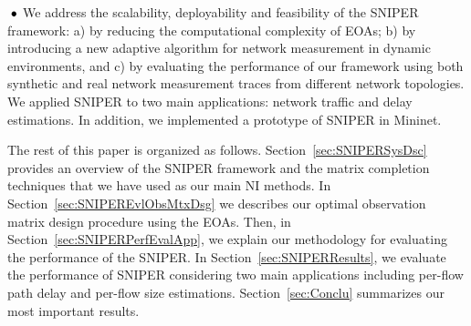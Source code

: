 \textbf{$\text{\hspace{0.1cm}}\bullet$} We address the scalability, deployability and feasibility of the SNIPER framework: a) by reducing the computational complexity of EOAs; b) by introducing a new adaptive algorithm for network measurement in dynamic environments, and c) by evaluating the performance of our framework using both synthetic and real network measurement traces from different network topologies. We applied SNIPER to two main applications: network traffic and delay estimations. In addition, we implemented a prototype of SNIPER in Mininet.

The rest of this paper is organized as follows. Section~\ref{sec:SNIPERSysDsc} provides an overview of the SNIPER framework and
the matrix completion techniques that we have used as our main NI methods.  In Section~\ref{sec:SNIPEREvlObsMtxDsg} we describes our
optimal observation matrix design procedure using the EOAs. Then, in Section~\ref{sec:SNIPERPerfEvalApp}, we explain our methodology for evaluating the performance of the SNIPER. In Section~\ref{sec:SNIPERResults}, we evaluate the performance of SNIPER considering two main applications including per-flow path delay and per-flow size estimations. Section~\ref{sec:Conclu} summarizes our most important results.
